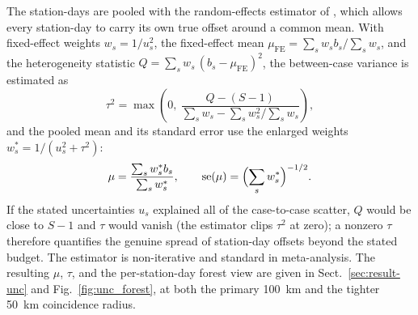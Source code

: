 The station-days are pooled with the random-effects estimator of \citet{dersimonian1986meta}, which allows every station-day to carry its own true offset around a common mean. With fixed-effect weights
$w_s = 1/u_s^2$, the fixed-effect mean $\mu_{\mathrm{FE}} = \sum_s w_s b_s / \sum_s w_s$, and the
heterogeneity statistic $Q = \sum_s w_s\,(b_s - \mu_{\mathrm{FE}})^2$, the between-case
variance is estimated as
%
\begin{equation}
  \tau^2 = \max\!\left(0,\
  \frac{Q - (S-1)}{\sum_s w_s - \sum_s w_s^2 / \sum_s w_s}\right),
  \label{eq:dl_tau}
\end{equation}
%
and the pooled mean and its standard error use the enlarged weights
%
$w_s^* = 1/(u_s^2 + \tau^2)$:
\begin{equation}
  \mu = \frac{\sum_s w_s^* b_s}{\sum_s w_s^*}, \qquad
  \mathrm{se}(\mu) = \Bigl(\sum_s w_s^*\Bigr)^{-1/2}.
  \label{eq:dl_mu}
\end{equation}
%
If the stated uncertainties $u_s$ explained all of the case-to-case scatter, $Q$ would be close to $S-1$ and $\tau$ would vanish (the estimator clips $\tau^2$ at zero); a nonzero $\tau$ therefore quantifies the genuine spread of station-day offsets beyond the stated budget. The estimator is non-iterative and standard in meta-analysis. The resulting $\mu$, $\tau$, and the per-station-day forest view are given in Sect.~\ref{sec:result-unc} and Fig.~\ref{fig:unc_forest}, at both the primary 100~km and the tighter 50~km coincidence radius.


